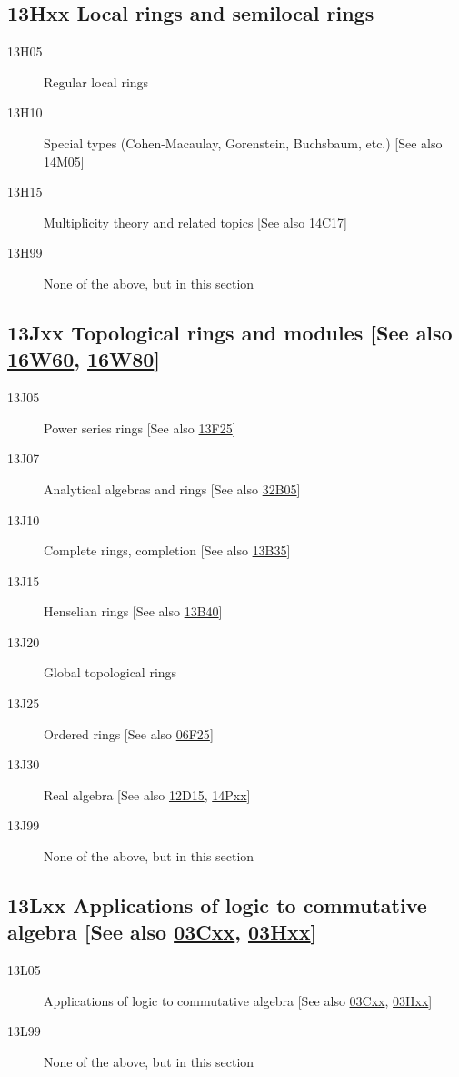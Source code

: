 \documentclass[letterpaper]{article}
\begin{document}
\subsection*{13Hxx Local rings and semilocal rings }\label{13Hxx}
\begin{description}               
\item [13H05]\label{13H05} Regular local rings
\item [13H10]\label{13H10} Special types (Cohen-Macaulay, Gorenstein, Buchsbaum, etc.) [See also \hyperref[14M05]{14M05}]
\item [13H15]\label{13H15} Multiplicity theory and related topics [See also \hyperref[14C17]{14C17}]
\item [13H99]\label{13H99} None of the above, but in this section
\end{description}          
\subsection*{13Jxx Topological rings and modules [See also \hyperref[16W60]{16W60}, \hyperref[16W80]{16W80}] }\label{13Jxx}
\begin{description}               
\item [13J05]\label{13J05} Power series rings [See also \hyperref[13F25]{13F25}]
\item [13J07]\label{13J07} Analytical algebras and rings [See also \hyperref[32B05]{32B05}]
\item [13J10]\label{13J10} Complete rings, completion [See also \hyperref[13B35]{13B35}]
\item [13J15]\label{13J15} Henselian rings [See also \hyperref[13B40]{13B40}]
\item [13J20]\label{13J20} Global topological rings
\item [13J25]\label{13J25} Ordered rings [See also \hyperref[06F25]{06F25}]
\item [13J30]\label{13J30} Real algebra [See also \hyperref[12D15]{12D15}, \hyperref[14Pxx]{14Pxx}]
\item [13J99]\label{13J99} None of the above, but in this section
\end{description}          
\subsection*{13Lxx Applications of logic to commutative algebra [See also \hyperref[03Cxx]{03Cxx}, \hyperref[03Hxx]{03Hxx}] }\label{13Lxx}
\begin{description}               
\item [13L05]\label{13L05} Applications of logic to commutative algebra [See also \hyperref[03Cxx]{03Cxx}, \hyperref[03Hxx]{03Hxx}]
\item [13L99]\label{13L99} None of the above, but in this section
\end{description}          
\end{document}
